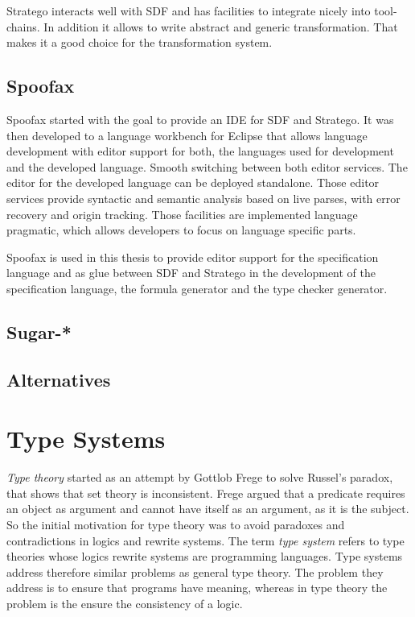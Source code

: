 \documentclass[a4paper,twoside]{report}
\begin{document}

Stratego interacts well with SDF and has facilities to integrate
nicely into tool-chains. In addition it allows to write abstract and
generic transformation. That makes it a good choice for the
transformation system.
\subsection{Spoofax}
Spoofax started with the goal to provide an IDE for SDF and
Stratego. It was then developed to a language workbench for Eclipse
that allows language development with editor support for both, the
languages used for development and the developed language. Smooth
switching between both editor services. The editor for the developed
language can be deployed standalone. Those editor services provide
syntactic and semantic analysis based on live parses, with error
recovery and origin tracking. Those facilities are implemented
language pragmatic, which allows developers to focus on language
specific parts.

Spoofax is used in this thesis to provide editor support for the
specification language and as glue between SDF and Stratego in the
development of the specification language, the formula generator and
the type checker generator.
\subsection{Sugar-*}
\subsection{Alternatives}
\section{Type Systems}
\textit{Type theory} started as an attempt by Gottlob Frege to solve Russel's
paradox, that shows that \naive set theory is inconsistent. Frege
argued that a predicate requires an object as argument and cannot have
itself as an argument, as it is the subject. So the initial motivation for type theory was to avoid
paradoxes and contradictions in logics and rewrite systems. The term
\textit{type system} refers to type theories whose logics rewrite
systems are programming languages. Type systems address therefore
similar problems as general type theory. The problem they address is
to ensure that programs have meaning, whereas in type theory the
problem is the ensure the consistency of a logic.
\end{document}
